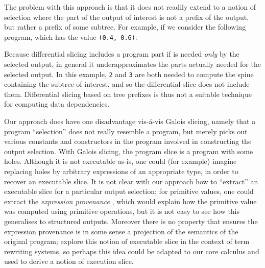 The problem with this approach is that it does not readily extend to a notion of selection where the part of the output of interest is not a prefix of the output, but rather a prefix of some subtree. For example, if we consider the following program, which has the value \lstinline{(0.4, 0.6)}:



\noindent Because differential slicing includes a program part if is needed \emph{only} by the selected output, in general it underapproximates the parts actually needed for the selected output. In this example, \lstinline{2} and \lstinline{3} are both needed to compute the spine containing the subtree of interest, and so the differential slice does not include them. Differential slicing based on tree prefixes is thus not a suitable technique for computing data dependencies.

Our approach does have one disadvantage vis-\'a-vis Galois slicing, namely that a program ``selection'' does not really resemble a program, but merely picks out various constants and constructors in the program involved in constructing the output selection. With Galois slicing, the program slice is a program with some holes. Although it is not executable as-is, one could (for example) imagine replacing holes by arbitrary expressions of an appropriate type, in order to recover an executable slice. It is not clear with our approach how to ``extract'' an executable slice for a particular output selection; for primitive values, one could extract the \emph{expression provenance} \cite{acar12}, which would explain how the primitive value was computed using primitive operations, but it is not easy to see how this generalises to structured outputs. Moreover there is no property that ensures the expression provenance is in some sense a projection of the semantics of the original program; \cite{field98} explore this notion of executable slice in the context of term rewriting systems, so perhaps this idea could be adapted to our core calculus and used to derive a notion of execution slice. 
